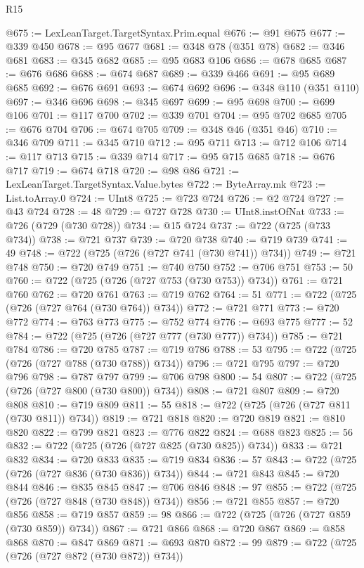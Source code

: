 \begin{lexlean}{R15}
\begin{coremodule}
@675 := LexLeanTarget.TargetSyntax.Prim.equal
@676 := @91 @675
@677 := @339 @450
@678 := @95 @677
@681 := @348 @78 (@351 @78)
@682 := @346 @681
@683 := @345 @682
@685 := @95 @683 @106
@686 := @678 @685
@687 := @676 @686
@688 := @674 @687
@689 := @339 @466
@691 := @95 @689 @685
@692 := @676 @691
@693 := @674 @692
@696 := @348 @110 (@351 @110)
@697 := @346 @696
@698 := @345 @697
@699 := @95 @698
@700 := @699 @106
@701 := @117 @700
@702 := @339 @701
@704 := @95 @702 @685
@705 := @676 @704
@706 := @674 @705
@709 := @348 @46 (@351 @46)
@710 := @346 @709
@711 := @345 @710
@712 := @95 @711
@713 := @712 @106
@714 := @117 @713
@715 := @339 @714
@717 := @95 @715 @685
@718 := @676 @717
@719 := @674 @718
@720 := @98 @86
@721 := LexLeanTarget.TargetSyntax.Value.bytes
@722 := ByteArray.mk
@723 := List.toArray.{0}
@724 := UInt8
@725 := @723 @724
@726 := @2 @724
@727 := @43 @724
@728 := 48
@729 := @727 @728
@730 := UInt8.instOfNat
@733 := @726 (@729 (@730 @728))
@734 := @15 @724
@737 := @722 (@725 (@733 @734))
@738 := @721 @737
@739 := @720 @738
@740 := @719 @739
@741 := 49
@748 := @722 (@725 (@726 (@727 @741 (@730 @741)) @734))
@749 := @721 @748
@750 := @720 @749
@751 := @740 @750
@752 := @706 @751
@753 := 50
@760 := @722 (@725 (@726 (@727 @753 (@730 @753)) @734))
@761 := @721 @760
@762 := @720 @761
@763 := @719 @762
@764 := 51
@771 := @722 (@725 (@726 (@727 @764 (@730 @764)) @734))
@772 := @721 @771
@773 := @720 @772
@774 := @763 @773
@775 := @752 @774
@776 := @693 @775
@777 := 52
@784 := @722 (@725 (@726 (@727 @777 (@730 @777)) @734))
@785 := @721 @784
@786 := @720 @785
@787 := @719 @786
@788 := 53
@795 := @722 (@725 (@726 (@727 @788 (@730 @788)) @734))
@796 := @721 @795
@797 := @720 @796
@798 := @787 @797
@799 := @706 @798
@800 := 54
@807 := @722 (@725 (@726 (@727 @800 (@730 @800)) @734))
@808 := @721 @807
@809 := @720 @808
@810 := @719 @809
@811 := 55
@818 := @722 (@725 (@726 (@727 @811 (@730 @811)) @734))
@819 := @721 @818
@820 := @720 @819
@821 := @810 @820
@822 := @799 @821
@823 := @776 @822
@824 := @688 @823
@825 := 56
@832 := @722 (@725 (@726 (@727 @825 (@730 @825)) @734))
@833 := @721 @832
@834 := @720 @833
@835 := @719 @834
@836 := 57
@843 := @722 (@725 (@726 (@727 @836 (@730 @836)) @734))
@844 := @721 @843
@845 := @720 @844
@846 := @835 @845
@847 := @706 @846
@848 := 97
@855 := @722 (@725 (@726 (@727 @848 (@730 @848)) @734))
@856 := @721 @855
@857 := @720 @856
@858 := @719 @857
@859 := 98
@866 := @722 (@725 (@726 (@727 @859 (@730 @859)) @734))
@867 := @721 @866
@868 := @720 @867
@869 := @858 @868
@870 := @847 @869
@871 := @693 @870
@872 := 99
@879 := @722 (@725 (@726 (@727 @872 (@730 @872)) @734))

\end{coremodule}
\end{lexlean}
